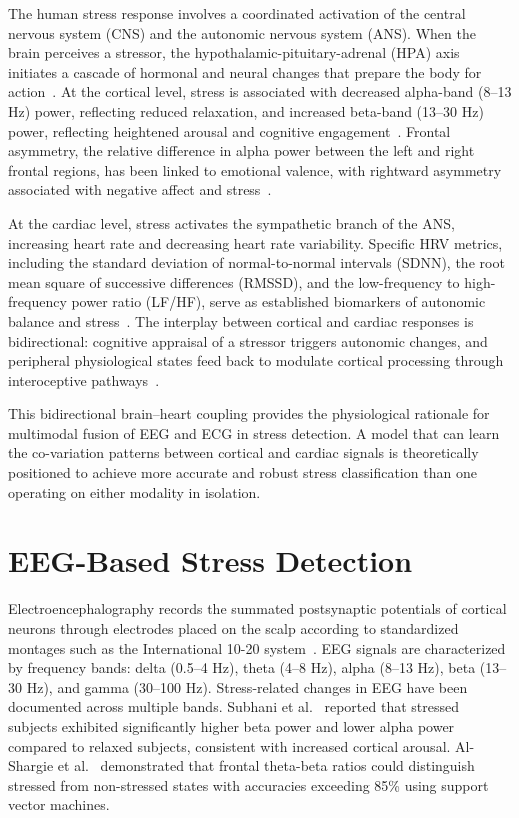\documentclass[12pt,letterpaper]{report}
\begin{document}
The human stress response involves a coordinated activation of the central nervous system (CNS) and the autonomic nervous system (ANS). When the brain perceives a stressor, the hypothalamic-pituitary-adrenal (HPA) axis initiates a cascade of hormonal and neural changes that prepare the body for action~\cite{mcewen2008}. At the cortical level, stress is associated with decreased alpha-band (8--13 Hz) power, reflecting reduced relaxation, and increased beta-band (13--30 Hz) power, reflecting heightened arousal and cognitive engagement~\cite{alberdi2016}. Frontal asymmetry, the relative difference in alpha power between the left and right frontal regions, has been linked to emotional valence, with rightward asymmetry associated with negative affect and stress~\cite{davidson2004}.

At the cardiac level, stress activates the sympathetic branch of the ANS, increasing heart rate and decreasing heart rate variability. Specific HRV metrics, including the standard deviation of normal-to-normal intervals (SDNN), the root mean square of successive differences (RMSSD), and the low-frequency to high-frequency power ratio (LF/HF), serve as established biomarkers of autonomic balance and stress~\cite{kim2018}. The interplay between cortical and cardiac responses is bidirectional: cognitive appraisal of a stressor triggers autonomic changes, and peripheral physiological states feed back to modulate cortical processing through interoceptive pathways~\cite{critchley2013}.

This bidirectional brain--heart coupling provides the physiological rationale for multimodal fusion of EEG and ECG in stress detection. A model that can learn the co-variation patterns between cortical and cardiac signals is theoretically positioned to achieve more accurate and robust stress classification than one operating on either modality in isolation.

\section{EEG-Based Stress Detection}
\label{sec:eeg_stress}

Electroencephalography records the summated postsynaptic potentials of cortical neurons through electrodes placed on the scalp according to standardized montages such as the International 10-20 system~\cite{jasper1958}. EEG signals are characterized by frequency bands: delta (0.5--4 Hz), theta (4--8 Hz), alpha (8--13 Hz), beta (13--30 Hz), and gamma (30--100 Hz). Stress-related changes in EEG have been documented across multiple bands. Subhani et al.~\cite{subhani2017} reported that stressed subjects exhibited significantly higher beta power and lower alpha power compared to relaxed subjects, consistent with increased cortical arousal. Al-Shargie et al.~\cite{alshargie2016} demonstrated that frontal theta-beta ratios could distinguish stressed from non-stressed states with accuracies exceeding 85\% using support vector machines.
\end{document}

